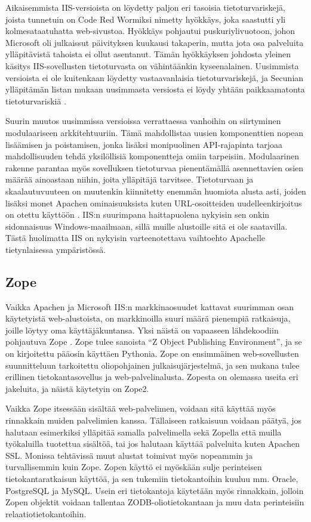 Aikaisemmista IIS-versioista on löydetty paljon eri tasoisia tietoturvariskejä, joista tunnetuin on Code Red Wormiksi nimetty hyökkäys, joka saastutti yli kolmesataatuhatta web-sivustoa.
Hyökkäys pohjautui puskuriylivuotoon, johon Microsoft oli julkaissut päivityksen kuukausi takaperin, mutta jota osa palveluita ylläpitävistä tahoista ei ollut asentanut. Tämän hyökkäyksen
johdosta yleinen käsitys IIS-sovellusten tietoturvasta on vähintäänkin kyseenalainen. Uusimmista versioista ei ole kuitenkaan löydetty vastaavanlaisia tietoturvariskejä, ja Secunian
ylläpitämän listan mukaan uusimmasta versiosta ei löydy yhtään paikkaamatonta tietoturvariskiä \cite{Secunia}.

Suurin muutos uusimmissa versioissa verrattaessa vanhoihin on siirtyminen modulaariseen arkkitehtuuriin. Tämä mahdollistaa uusien komponenttien nopean lisäämisen ja poistamisen, jonka lisäksi  
monipuolinen API-rajapinta tarjoaa mahdollisuuden tehdä yksilöllisiä komponentteja omiin tarpeisiin. Modulaarinen rakenne parantaa myös sovelluksen tietoturvaa pienentämällä asennettavien 
osien määrää ainoastaan niihin, joita ylläpitäjä tarvitsee. Tietoturvaan ja skaalautuvuuteen on muutenkin kiinnitetty enemmän huomiota alusta asti, joiden lisäksi monet Apachen ominaisuuksista
kuten URL-osoitteiden uudelleenkirjoitus on otettu käyttöön \cite{IIS}. IIS:n suurimpana haittapuolena nykyisin sen onkin sidonnaisuus Windows-maailmaan, sillä muille alustoille sitä ei ole 
saatavilla. Tästä huolimatta IIS on nykyisin varteenotettava vaihtoehto Apachelle tietynlaisessa ympäristössä. 

\subsection{Zope}

Vaikka Apachen ja Microsoft IIS:n markkinaosuudet kattavat suurimman osan käytetyistä web-alustoista, on markkinoilla suuri määrä pienempiä ratkaisuja, joille löytyy oma käyttäjäkuntansa. Yksi 
näistä on vapaaseen lähdekoodiin pohjautuva Zope \cite{Zope}. Zope tulee sanoista ``Z Object Publishing Environment'', ja se on kirjoitettu pääosin käyttäen Pythonia. Zope on ensimmäinen
web-sovellusten suunnitteluun tarkoitettu oliopohjainen julkaisujärjestelmä, ja sen mukana tulee erillinen tietokantasovellus ja web-palvelinalusta. Zopesta on olemassa useita eri jakeluita, ja 
näistä käytetyin on Zope2. 

Vaikka Zope itsessään sisältää web-palvelimen, voidaan sitä käyttää myös rinnakkain muiden palvelimien kanssa. Tällaiseen ratkaisuun voidaan päätyä, jos halutaan esimerkiksi ylläpitää samalla
palvelimella sekä Zopella että muilla työkaluilla tuotettua sisältöä, tai jos halutaan käyttää palveluita kuten Apachen SSL. Monissa tehtävissä muut alustat toimivat myös nopeammin ja 
turvallisemmin kuin Zope. Zopen käyttö ei myöskään sulje perinteisen tietokantaratkaisun käyttöä, ja sen tukemiin tietokantoihin kuuluu mm. Oracle, PostgreSQL ja MySQL. Usein eri 
tietokantoja käytetään myös rinnakkain, jolloin Zopen objektit voidaan tallentaa ZODB-oliotietokantaan ja muu data perinteisiin relaatiotietokantoihin. 

